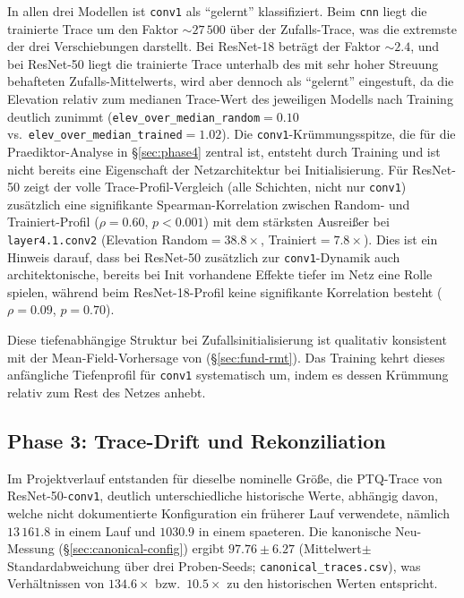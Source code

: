 In allen drei Modellen ist \texttt{conv1} als \enquote{gelernt} klassifiziert. Beim \texttt{cnn} liegt die trainierte Trace um den Faktor $\sim\!27\,500$ über der Zufalls-Trace, was die extremste der drei Verschiebungen darstellt. Bei ResNet-18 beträgt der Faktor $\sim\!2.4$, und bei ResNet-50 liegt die trainierte Trace unterhalb des mit sehr hoher Streuung behafteten Zufalls-Mittelwerts, wird aber dennoch als \enquote{gelernt} eingestuft, da die Elevation relativ zum medianen Trace-Wert des jeweiligen Modells nach Training deutlich zunimmt (\texttt{elev\_over\_median\_random}$=0.10$ vs.\ \texttt{elev\_over\_median\_trained}$=1.02$). Die \texttt{conv1}-Krümmungsspitze, die für die Praediktor-Analyse in \S\ref{sec:phase4} zentral ist, entsteht durch Training und ist nicht bereits eine Eigenschaft der Netzarchitektur bei Initialisierung. Für ResNet-50 zeigt der volle Trace-Profil-Vergleich (alle Schichten, nicht nur \texttt{conv1}) zusätzlich eine signifikante Spearman-Korrelation zwischen Random- und Trainiert-Profil ($\rho=0.60$, $p<0.001$) mit dem stärksten Ausreißer bei \texttt{layer4.1.conv2} (Elevation Random$=38.8\times$, Trainiert$=7.8\times$). Dies ist ein Hinweis darauf, dass bei ResNet-50 zusätzlich zur \texttt{conv1}-Dynamik auch architektonische, bereits bei Init vorhandene Effekte tiefer im Netz eine Rolle spielen, während beim ResNet-18-Profil keine signifikante Korrelation besteht ($\rho=0.09$, $p=0.70$).
\par\medskip

Diese tiefenabhängige Struktur bei Zufallsinitialisierung ist qualitativ konsistent mit der Mean-Field-Vorhersage von \citet{karakida_fisher_2019} (\S\ref{sec:fund-rmt}). Das Training kehrt dieses anfängliche Tiefenprofil für \texttt{conv1} systematisch um, indem es dessen Krümmung relativ zum Rest des Netzes anhebt.

\subsection{Phase 3: Trace-Drift und Rekonziliation}
\label{sec:phase3}

Im Projektverlauf entstanden für dieselbe nominelle Größe, die PTQ-Trace von ResNet-50-\texttt{conv1}, deutlich unterschiedliche historische Werte, abhängig davon, welche nicht dokumentierte Konfiguration ein früherer Lauf verwendete, nämlich $13\,161.8$ in einem Lauf und $1030.9$ in einem spaeteren. Die kanonische Neu-Messung (\S\ref{sec:canonical-config}) ergibt $97.76 \pm 6.27$ (Mittelwert$\pm$Standardabweichung über drei Proben-Seeds; \texttt{canonical\_traces.csv}), was Verhältnissen von $134.6\times$ bzw.\ $10.5\times$ zu den historischen Werten entspricht.

